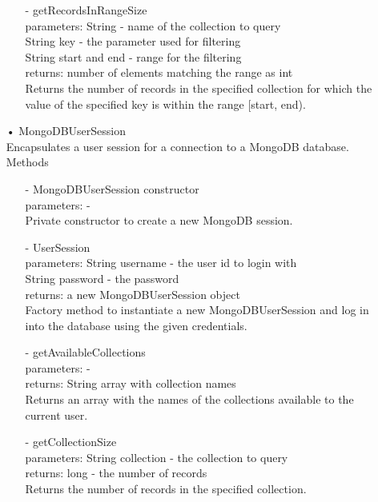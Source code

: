\documentclass[oneside, english, final]{design}
\begin{document}
\begin{itemize}
\begin{itemize}
		      \item[-]getRecordsInRangeSize
		            \\parameters: String - name of the collection to query
		            \\String key - the parameter used for filtering
		            \\String start and end - range for the filtering
		            \\returns: number of elements matching the range as int
		            \\Returns the number of records in the specified
				collection for which the value of the specified
				key is within the range [start, end).
	      \end{itemize}



	\item[•]MongoDBUserSession
		\\Encapsulates a user session for a connection to a MongoDB database.
		\\Methods
	      \begin{itemize}
		      \item[-]MongoDBUserSession constructor
		            \\parameters: -
		            \\Private constructor to create a new MongoDB session.

		      \item[-]UserSession
		            \\parameters: String username - the user id to login with
			    \\String password - the password
			    \\returns: a new MongoDBUserSession object
		            \\Factory method to instantiate a new MongoDBUserSession and log in into the database using the given credentials.

		      \item[-]getAvailableCollections
		            \\parameters: -
		            \\returns: String array with collection names
		            \\Returns an array with the names of the collections available to the current user.

		      \item[-]getCollectionSize
		            \\parameters: String collection - the collection to query
		            \\returns: long - the number of records
		            \\Returns the number of records in the specified collection.


\end{itemize}
\end{itemize}
\end{document}
